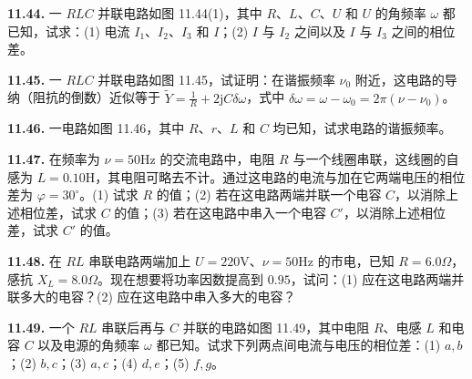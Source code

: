 \begin{center}
\end{center}

\vfill
\newpage

\textbf{11.44.} 一 $RLC$ 并联电路如图 11.44(1)，其中 $R$、$L$、$C$、$U$ 和 $U$ 的角频率 $\omega$ 都已知，试求：(1) 电流 $I_{1}$、$I_{2}$、$I_{3}$ 和 $I$；(2) $I$ 与 $I_{2}$ 之间以及 $I$ 与 $I_{3}$ 之间的相位差。

\begin{center}
\end{center}

\vfill
\newpage

\textbf{11.45.} 一 $RLC$ 并联电路如图 11.45，试证明：在谐振频率 $\nu_{0}$ 附近，这电路的导纳（阻抗的倒数）近似等于 $\displaystyle \widetilde{Y} = \frac{1}{R} + 2\mathrm{j}C\delta\omega$，式中 $\delta\omega = \omega - \omega_{0} = 2\pi(\nu - \nu_{0})$。

\begin{center}
\end{center}

\vfill
\newpage

\textbf{11.46.} 一电路如图 11.46，其中 $R$、$r$、$L$ 和 $C$ 均已知，试求电路的谐振频率。

\begin{center}
\end{center}

\vfill
\newpage

\textbf{11.47.} 在频率为 $\nu = 50\mathrm{Hz}$ 的交流电路中，电阻 $R$ 与一个线圈串联，这线圈的自感为 $L = 0.10\mathrm{H}$，其电阻可略去不计。通过这电路的电流与加在它两端电压的相位差为 $\varphi = 30^{\circ}$。(1) 试求 $R$ 的值；(2) 若在这电路两端并联一个电容 $C$，以消除上述相位差，试求 $C$ 的值；(3) 若在这电路中串入一个电容 $C'$，以消除上述相位差，试求 $C'$ 的值。

\vfill
\newpage

\textbf{11.48.} 在 $RL$ 串联电路两端加上 $U = 220\mathrm{V}$、$\nu = 50\mathrm{Hz}$ 的市电，已知 $R = 6.0\Omega$，感抗 $X_{L} = 8.0\Omega$。现在想要将功率因数提高到 $0.95$，试问：(1) 应在这电路两端并联多大的电容？(2) 应在这电路中串入多大的电容？

\vfill
\newpage

\textbf{11.49.} 一个 $RL$ 串联后再与 $C$ 并联的电路如图 11.49，其中电阻 $R$、电感 $L$ 和电容 $C$ 以及电源的角频率 $\omega$ 都已知。试求下列两点间电流与电压的相位差：(1) $a, b$；(2) $b, c$；(3) $a, c$；(4) $d, e$；(5) $f, g$。

